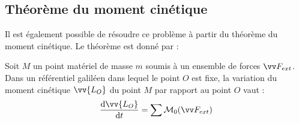 \documentclass[11pt,fleqn]{book} %
\newcommand{\dd}{\mathrm{d}}
\begin{document}

\subsection{Théorème du moment cinétique}

Il est également possible de résoudre ce problème à partir du théorème du moment cinétique. Le théorème est donné par :
\begin{theorem}
    Soit $M$ un point matériel de masse $m$ soumis à un ensemble de forces $\vv F_{ext}$. Dans un référentiel galiléen dans lequel le point $O$ est fixe, la variation du moment cinétique $\vv{L_O}$ du point $M$ par rapport au point $O$ vaut :
    \begin{equation}
        \frac{\dd \vv{L_O}}{\dd t} = \sum \mathcal{M}_0 ( \vv F_{ext} )
    \end{equation}
\end{theorem}
\end{document}
